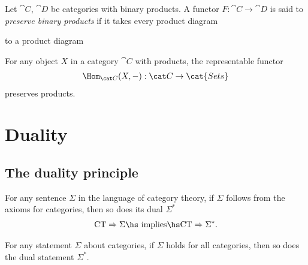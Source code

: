 \documentclass{article}
\begin{document}
\begin{definition}[Awodey 2.21]
    Let $\cat C$, $\cat D$ be categories with binary products. A functor
    $F:\cat C\to \cat D$ is said to \emph{preserve binary products} if it takes
    every product diagram
    \begin{center}
    \end{center}
    to a product diagram
    \begin{center}
    \end{center}
\end{definition}

\begin{corollary}[Awodey 2.22]
    For any object $X$ in a category $\cat C$ with products, the representable
    functor 
    \begin{align*}
        \Hom_{\cat C}(X, -) : \cat C \to \cat{Sets}
    \end{align*}
    preserves products.
\end{corollary}

\section{Duality}

\subsection{The duality principle}

\begin{proposition}
    For any sentence $\Sigma$ in the language of category theory,
    if $\Sigma$ follows from the axioms for categories, then so does
    its dual $\Sigma^*$
    \begin{align*}
        \text{CT}\Rightarrow \Sigma \text{\hs implies\hs} \text{CT}\Rightarrow \Sigma^*.
    \end{align*} 
\end{proposition}

\begin{proposition}
    For any statement $\Sigma$ about categories, if $\Sigma$ holds for all categories,
    then so does the dual statement $\Sigma^*$.
\end{proposition}
\end{document}
